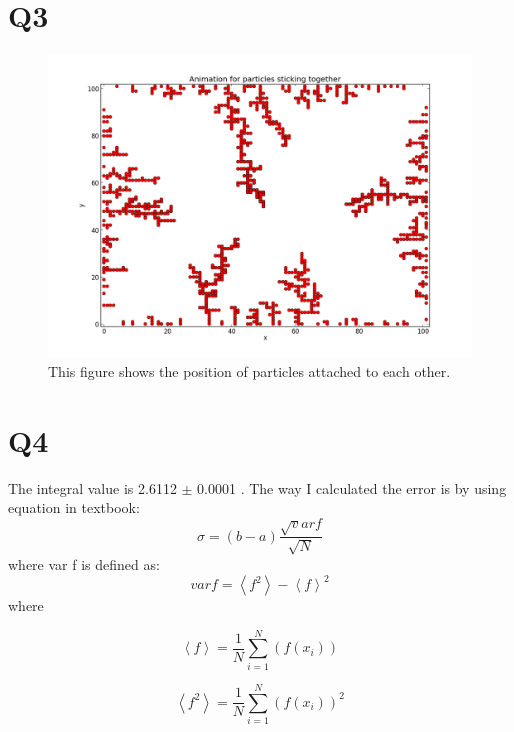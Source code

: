 \documentclass[letterpaper,12pt]{article}
\begin{document}
\section*{Q3}

\FloatBarrier
\begin{figure}[H]
\centering
\includegraphics[scale=0.5]{q3.png}
\caption{This figure shows the position of particles attached to each other.}
\end{figure}
\FloatBarrier

\section*{Q4}
The integral value is 2.6112 $\pm$ 0.0001 . The way I calculated the error is by using equation in textbook:
\begin{equation}
\sigma = (b-a) \frac{\sqrt var f}{\sqrt N}
\end{equation}
where var f is defined as:
\begin{equation}
var f =\left \langle f^2 \right \rangle - \left \langle f \right \rangle ^2
\end{equation}
where

\begin{equation}
\left \langle f \right \rangle = \frac{1}{N} \sum_{i=1}^{N}(f(x_i))
\end{equation}

\begin{equation}
\left \langle f^2 \right \rangle = \frac{1}{N} \sum_{i=1}^{N} (f(x_i))^2
\end{equation}
\end{document}
